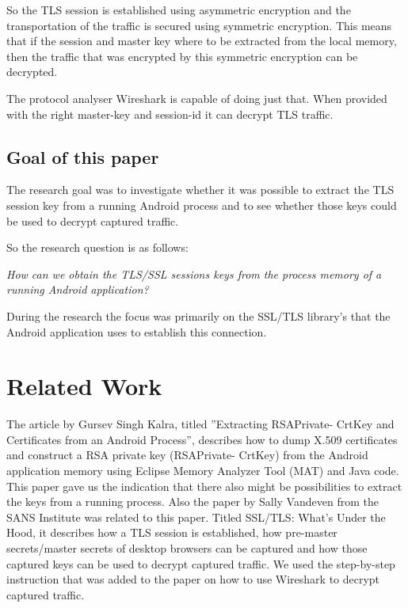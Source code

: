 \documentclass[12pt, a4paper]{report}
\begin{document}
So the TLS session is established using asymmetric encryption and the transportation of the traffic is secured using symmetric encryption. This means that if the session and master key where to be extracted from the local memory, then the traffic that was encrypted by this symmetric encryption can be decrypted. 

The protocol analyser Wireshark is capable of doing just that. When provided with the right master-key and session-id it can decrypt TLS traffic.\cite{ref1}\cite{book1}

\section{Goal of this paper}

The research goal was to investigate whether it was possible to extract the TLS session key from a running Android process and to see whether those keys could be used to decrypt captured traffic. 

So the research question is as follows:

\begin{framed}
\noindent \textit{How can we obtain the TLS/SSL sessions keys from the process memory of a running Android application?}
\end{framed}

During the research the focus was primarily on the SSL/TLS library's that the Android application uses to establish this connection.

\chapter{Related Work}
The article by Gursev Singh Kalra, titled ”Extracting RSAPrivate-
CrtKey and Certificates from an Android Process”, describes how to
dump X.509 certificates and construct a RSA private key (RSAPrivate-
CrtKey) from the Android application memory using Eclipse Memory
Analyzer Tool (MAT) and Java code. This paper gave us the indication that there also might be possibilities to extract the keys from a running
process.\cite{ref1}
\newline
\newline
Also the paper by Sally Vandeven from the SANS Institute was related to this paper. Titled SSL/TLS: What's Under the Hood, it describes how a TLS session is established, how pre-master secrets/master secrets of desktop browsers can be captured and how those captured keys can be used to decrypt captured traffic. We used the step-by-step instruction that was added to the paper on how to use Wireshark to decrypt captured traffic.\cite{ref2}
\end{document}
